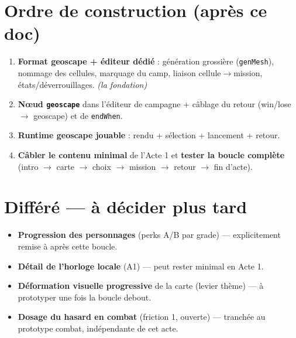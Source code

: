 \documentclass[11pt,a4paper]{article}
\begin{document}
\section{Ordre de construction (après ce doc)}
\begin{enumerate}
\item \textbf{Format geoscape + éditeur dédié} : génération grossière (\texttt{genMesh}), nommage des cellules, marquage du camp, liaison cellule$\to$mission, états/déverrouillages. \emph{(la fondation)}
\item \textbf{Nœud \texttt{geoscape}} dans l'éditeur de campagne + câblage du retour (win/lose $\to$ geoscape) et de \texttt{endWhen}.
\item \textbf{Runtime geoscape jouable} : rendu + sélection + lancement + retour.
\item \textbf{Câbler le contenu minimal} de l'Acte 1 et \textbf{tester la boucle complète} (intro $\to$ carte $\to$ choix $\to$ mission $\to$ retour $\to$ fin d'acte).
\end{enumerate}

\section{Différé --- à décider plus tard}
\begin{defer}
\begin{itemize}
\item \textbf{Progression des personnages} (perks A/B par grade) --- explicitement remise à après cette boucle.
\item \textbf{Détail de l'horloge locale} (A1) --- peut rester minimal en Acte 1.
\item \textbf{Déformation visuelle progressive} de la carte (levier thème) --- à prototyper une fois la boucle debout.
\item \textbf{Dosage du hasard en combat} (friction 1, ouverte) --- tranchée au prototype combat, indépendante de cet acte.
\end{itemize}
\end{defer}
\end{document}

